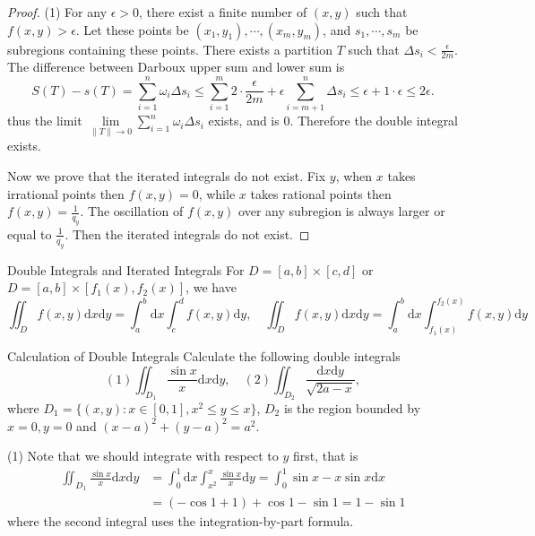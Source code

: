 \begin{proof}
  (1) For any $\epsilon > 0$, there exist a finite number of $(x, y)$
  such that $f(x,y) > \epsilon$.
  Let these points be $(x_1, y_1),\cdots,(x_m, y_m)$,
  and $s_1,\cdots,s_m$ be subregions containing these points.
  There exists a partition $T$ such that $\Delta s_i < \frac{\epsilon}{2m}$.
  The difference between Darboux upper sum and lower sum is
  \begin{equation}
    S(T) - s(T) = \sum\limits_{i = 1}^n \omega_i \Delta s_i
    \leq \sum\limits_{i = 1}^m 2 \cdot \frac{\epsilon}{2m} +  \epsilon \sum\limits_{i = m+1}^n \Delta s_i
    \leq \epsilon + 1 \cdot \epsilon
    \leq 2 \epsilon.
  \end{equation}
  thus the limit $\lim \limits _{\|T\| \rightarrow 0} \sum\limits_{i = 1}^n
  \omega_i \Delta s_i$ exists, and is $0$. Therefore the double integral exists.

  Now we prove that the iterated integrals do not exist.
  Fix $y$, when $x$ takes irrational points then $f(x,y) = 0$,
  while $x$ takes rational points then $f(x,y)=\frac{1}{q_y}$.
  The oscillation of $f(x,y)$ over any subregion is always larger or equal to $\frac{1}{q_y}$.
  Then the iterated integrals do not exist.
\end{proof}

\begin{proposition}{Double Integrals and Iterated Integrals}{}
  For $D = [a, b] \times [c, d]$ or $D = [a, b] \times [f_1(x), f_2(x)]$,
  we have
  \begin{equation}
    \iint_Df(x,y)\mathrm{d}x\mathrm{d}y=\int_a^b\mathrm{d}x\int_c^df(x,y)\mathrm{d}y,\quad
    \iint_Df(x,y)\mathrm{d}x\mathrm{d}y=\int_a^b\mathrm{d}x\int_{f_1(x)}^{f_2(x)}f(x,y)\mathrm{d}y
  \end{equation}
\end{proposition}

\begin{example}{Calculation of Double Integrals}{}
  Calculate the following double integrals
  \begin{equation}
    (1) \iint_{D_1} \frac{\sin x}{x}\mathrm{d} x\mathrm{d}y, \quad
    (2) \iint_{D_2} \frac{\mathrm{d}x\mathrm{d}y}{\sqrt{2a - x}},
  \end{equation}
  where $D_1 = \{(x, y): x \in [0, 1], x^2 \leq y \leq x\}$,
  $D_2$ is the region bounded by $x=0, y=0$ and $(x-a)^2 + (y-a)^2 = a^2$.
\end{example}

\begin{solution}
  (1) Note that we should integrate with respect to $y$ first, that is
  \begin{align}
    \iint_{D_1} \frac{\sin x}{x}\mathrm{d} x \mathrm{d} y
    &= \int_0^1 \mathrm{d} x \int_{x^2}^x \frac{\sin x}{x} \mathrm{d} y
    = \int_0^1 \sin x - x\sin x\mathrm{d} x\\
    &= (-\cos 1 + 1) + \cos 1 - \sin 1
      = 1 - \sin 1
  \end{align}
  where the second integral uses the integration-by-part formula.
\end{solution}


